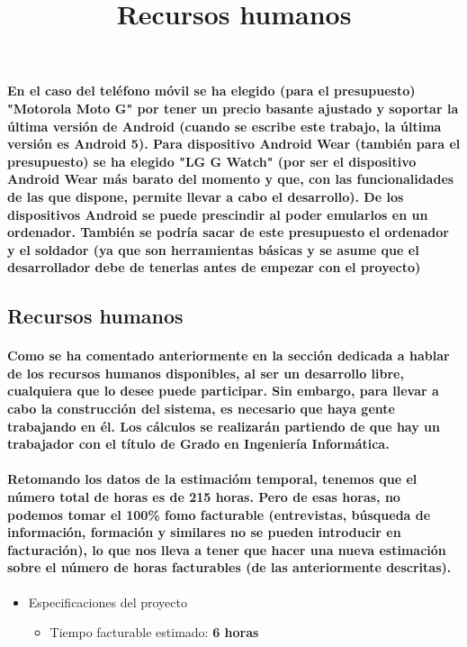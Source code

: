 \paragraph{En el caso del teléfono móvil se ha elegido (para el presupuesto) "Motorola Moto G" por tener
un precio basante ajustado y soportar la última versión de Android (cuando se escribe este
trabajo, la última versión es Android 5). Para dispositivo Android Wear (también para el presupuesto)
se ha elegido "LG G Watch" (por ser el dispositivo Android Wear más barato del momento
y que, con las funcionalidades de las que dispone, permite llevar a cabo el desarrollo). De los dispositivos
Android se puede prescindir al poder emularlos en un ordenador. También se podría sacar
de este presupuesto el ordenador y el soldador (ya que son herramientas básicas y se asume
que el desarrollador debe de tenerlas antes de empezar con el proyecto)}

\subsection{Recursos humanos}
\title{Recursos humanos}
\paragraph{
Como se ha comentado anteriormente en la sección dedicada a hablar de los recursos humanos disponibles,
al ser un desarrollo libre, cualquiera que lo desee puede participar. Sin embargo, para llevar a cabo la
construcción del sistema, es necesario que haya gente trabajando en él. Los cálculos
se realizarán partiendo de que hay un trabajador con el título de Grado en Ingeniería Informática.
}

\paragraph{
Retomando los datos de la estimacióm temporal, tenemos que el número total de horas es
de 215 horas. Pero de esas horas, no podemos tomar el 100\% fomo facturable (entrevistas,
búsqueda de información, formación y similares no se pueden introducir en facturación),
lo que nos lleva a tener que hacer una nueva estimación sobre el número de horas facturables
(de las anteriormente descritas).
}

\begin{itemize}
  \item Especificaciones del proyecto
  \begin{itemize}
    \item{Tiempo facturable estimado: \textbf{6 horas}}
  \end{itemize}
\end{itemize}

